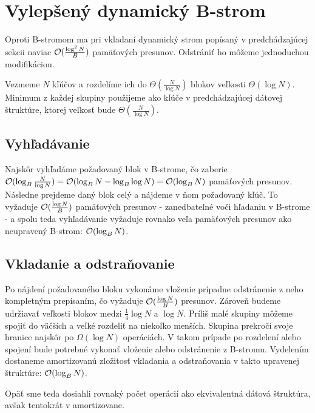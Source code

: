 \section{Vylepšený dynamický B-strom}
Oproti \aware B-stromom ma pri vkladaní \obliv dynamický strom popísaný v predchádzajúcej sekcii naviac $\mathcal{O}(\frac{\log^2{N}}{B})$ pamäťových presunov. Odstrániť ho môžeme jednoduchou modifikáciou.

Vezmeme $N$ kľúčov a rozdelíme ich do $\Theta(\frac{N}{\log{N}})$ blokov veľkosti $\Theta(\log{N})$. Minimum z každej skupiny použijeme ako kľúče v predchádzajúcej dátovej štruktúre, ktorej veľkosť bude $\Theta(\frac{N}{\log{N}})$.

\subsection{Vyhľadávanie}
Najskôr vyhľadáme požadovaný blok v B-strome, čo zaberie $\mathcal{O}(\log_B{\frac{N}{\log{N}}}) = \mathcal{O}(\log_B{N}-\log_B{\log{N}}) = \mathcal{O}(\log_B{N})$ pamäťových presunov. Následne prejdeme daný blok celý a nájdeme v ňom požadovaný kľúč. To vyžaduje $\mathcal{O}(\frac{\log{N}}{B})$ pamäťových presunov - zanedbateľné voči hľadaniu v B-strome - a spolu teda vyhľadávanie vyžaduje rovnako veľa pamäťových presunov ako neupravený B-strom: $\mathcal{O}(\log_B{N})$. 

\subsection{Vkladanie a odstraňovanie}
Po nájdení požadovaného bloku vykonáme vloženie prípadne odstránenie z neho kompletným prepísaním, čo vyžaduje $\mathcal{O}(\frac{\log{N}}{B})$ presunov. Zároveň budeme udržiavať veľkosti blokov medzi $\frac{1}{4}\log{N}$ a $\log{N}$. Príliš malé skupiny môžeme spojiť do väčších a veľké rozdeliť na niekoľko menších. Skupina prekročí svoje hranice najskôr po $\Omega(\log{N})$ operáciách. V takom prípade po rozdelení alebo spojení bude potrebné vykonať vloženie alebo odstránenie z B-stromu. Vydelením dostaneme amortizovanú zložitosť vkladania a odstraňovania v takto upravenej štruktúre: $\mathcal{O}(\log_B{N})$.

Opäť sme teda dosiahli rovnaký počet operácií ako ekvivalentná \aware dátová štruktúra, avšak tentokrát v amortizovane.



